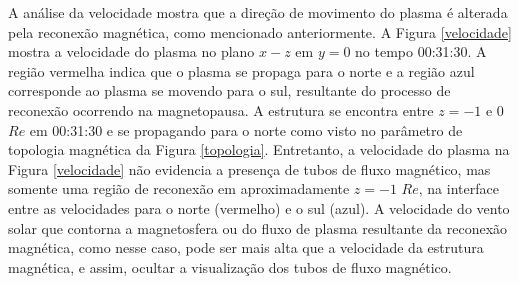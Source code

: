 A análise da velocidade mostra que a direção de movimento do plasma é alterada pela reconexão magnética, como mencionado anteriormente. A Figura \ref{velocidade} mostra a velocidade do plasma no plano $x-z$ em $y= 0$ no tempo 00:31:30. A região vermelha indica que o plasma se propaga para o norte e a região azul corresponde ao plasma se movendo para o sul, resultante do processo de reconexão ocorrendo na magnetopausa. A estrutura se encontra entre $z= -1$ e $0$ $Re$ em 00:31:30 e se propagando para o norte como visto no parâmetro de topologia magnética da Figura \ref{topologia}. Entretanto, a velocidade do plasma na Figura \ref{velocidade} não evidencia a presença de tubos de fluxo magnético, mas somente uma região de reconexão em aproximadamente $z= -1$ $Re$, na interface entre as velocidades para o norte (vermelho) e o sul (azul). A velocidade do vento solar que contorna a magnetosfera ou do fluxo de plasma resultante da reconexão magnética, como nesse caso, pode ser mais alta que a velocidade da estrutura magnética, e assim, ocultar a visualização dos tubos de fluxo magnético. 

